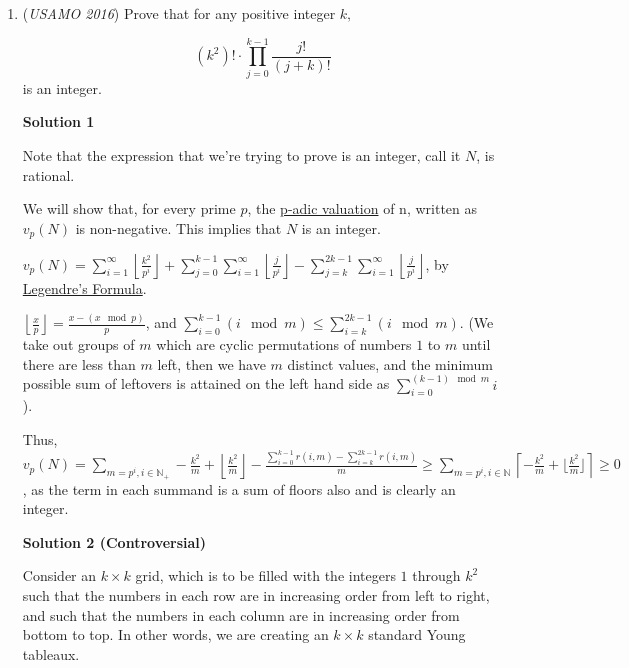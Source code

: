 \begin{enumerate}
	\item (\textit{USAMO 2016}) Prove that for any positive integer $k,$

 \[\left(k^2\right)!\cdot\prod_{j=0}^{k-1}\frac{j!}{\left(j+k\right)!}\]
is an integer.


 



\textbf{Solution 1}

Note that the expression that we're trying to prove is an integer, call it $N$, is rational.

 We will show that, for every prime $p$, the \href{https://artofproblemsolving.com/wiki/index.php?title=P-adic\_valuation}{p-adic valuation} of n, written as $v_p(N)$ is non-negative. This implies that $N$ is an integer.

 $v_p(N)=\sum_{i=1}^\infty \left\lfloor \frac{k^{2}}{p^{i}} \right\rfloor+\sum_{j=0}^{k-1} \sum_{i=1}^\infty \left\lfloor \frac{j}{p^{i}}\right\rfloor-\sum_{j=k}^{2k-1} \sum_{i=1}^\infty \left\lfloor \frac{j}{p^{i}} \right\rfloor$, by \href{https://artofproblemsolving.com/wiki/index.php?title=Legendre\%27s\_Formula}{Legendre's Formula}.

 $\left\lfloor{\frac{x}{p}}\right\rfloor={\frac{x-(x \mod p)}{p}}$, and $\sum_{i=0}^{k-1} (i \mod m)\leq \sum_{i=k}^{2k-1} (i \mod m)$. (We take out groups of $m$ which are cyclic permutations of numbers $1$ to $m$ until there are less than $m$ left, then we have $m$ distinct values, and the minimum possible sum of leftovers is attained on the left hand side as $\sum_{i=0}^{(k -1) \mod m} i$).

 Thus, $v_p(N)=\sum_{m=p^{i}, i\in \mathbb{N}_{+}}-\frac{k^{2}}{m}+\left\lfloor{\frac{k^{2}}{m}}\right\rfloor-\frac{\sum_{i=0}^{k-1} r(i,m)-\sum_{i=k}^{2k-1} r(i,m)}{m} \geq \sum_{m=p^{i}, i\in \mathbb{N}} \left\lceil -\frac{k^{2}}{m}+\lfloor{\frac{k^{2}}{m}}\rfloor\right\rceil \geq 0$, as the term in each summand is a sum of floors also and is clearly an integer.

 



\textbf{Solution 2 (Controversial)}

Consider an $k\times k$ grid, which is to be filled with the integers $1$ through $k^2$ such that the numbers in each row are in increasing order from left to right, and such that the numbers in each column are in increasing order from bottom to top. In other words, we are creating an $k\times k$ standard Young tableaux.


\end{enumerate}
